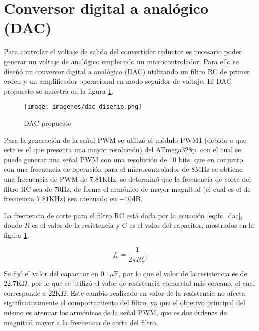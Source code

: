 \section{Conversor digital a analógico (DAC)}

    Para controlar el voltaje de salida del convertidor reductor es necesario
    poder generar un voltaje de analógico empleando un microcontrolador. Para ello se diseñó
    un conversor digital a analógico (DAC) utilizando un filtro RC de primer
    orden y un amplificador operacional en modo seguidor de voltaje. El DAC
    propuesto se muestra en la figura \ref{fig:dac}.

    \begin{figure}[H]
        \centering
        \texttt{[image: imagenes/dac\_disenio.png]}
        \caption{DAC propuesto}
        \label{fig:dac}
    \end{figure}

    Para la generación de la señal PWM se utilizó el módulo PWM1 (debido
    a que este es el que presenta una mayor resolución) del ATmega328p, con el 
    cual se puede generar una señal PWM con una resolución de 10 bits, que en
    conjunto con una frecuencia de operación para el microcontrolador de $8\text{MHz}$
    se obtiene una frecuencia de PWM de $7.81\text{KHz}$, se determinó que la 
    frecuencia de corte del filtro RC sea de $70\text{Hz}$, de forma el armónico
    de mayor magnitud (el cual es el de frecuencia $7.81\text{KHz}$) sea atenuado
    en $-40\text{dB}$. 

    La frecuencia de corte para el filtro RC está dada por la ecuación \ref{eq:fc_dac},
    donde $R$ es el valor de la resistencia y $C$ es el valor del capacitor, mostrados
    en la figura \ref{fig:dac}.

    \begin{equation}
        f_c = \frac{1}{2\pi RC}
        \label{eq:fc_dac}
    \end{equation}

    Se fijó el valor del capacitor en $0.1\mu\text{F}$, por lo que el valor de la
    resistencia es de $22.7\text{K}\Omega$, por lo que se utilizó el valor 
    de resistencia comercial más cercano, el cual corresponde a $22\text{K}\Omega$.
    Este cambio realizado en valor de la resistencia no afecta
    significativamente el comportamiento del filtro, ya que el objetivo 
    principal del mismo es atenuar los armónicos de la señal PWM, que es 
    dos órdenes de magnitud mayor a la frecuencia de corte del filtro.

